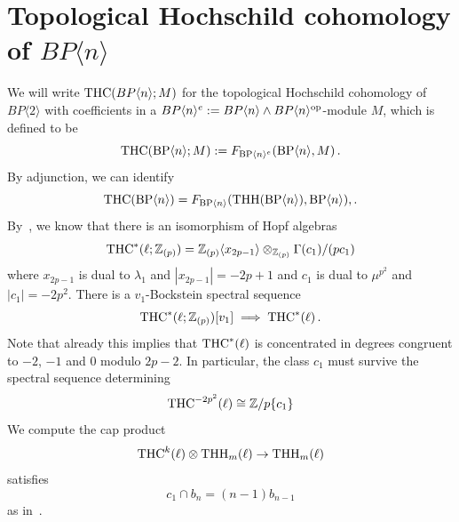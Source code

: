 
\section{Topological Hochschild cohomology of $BP\langle n\rangle$}
We will write $\mathrm{THC}(BP\langle n\rangle ; M)$ for the topological Hochschild cohomology of $BP\langle 2\rangle$ with coefficients in a $BP\langle n \rangle^e:=BP\langle n \rangle\wedge BP\langle n \rangle^{\mathrm{op}}$-module $M$, which is defined to be
\[ 
\mathrm{THC}(\mathrm{BP}\langle n\rangle;M) :=  F_{\mathrm{BP}\langle n\rangle^e} (\mathrm{BP}\langle n\rangle,M) \,. 
\]
By adjunction, we can identify
\[\mathrm{THC}(\mathrm{BP}\langle n\rangle)=F_{\mathrm{BP}\langle n\rangle} (\operatorname{THH}(\mathrm{BP}\langle n\rangle),\mathrm{BP}\langle n\rangle),. 
\]
By~\cite{AHL10}, we know that there is an isomorphism of Hopf algebras
\[ \mathrm{THC}^*(\ell;\mathbb{Z}_{(p)})=\mathbb{Z}_{(p)}\langle x_{2p-1}\rangle\otimes_{\mathbb{Z}_{(p)}}\Gamma(c_{1})/(pc_{1})
\]
where $x_{2p-1}$ is dual to $\lambda_1$ and $|x_{2p-1}|=-2p+1$ and $c_1$ is dual to $\mu^{p^2}$ and $|c_1|=-2p^2$. 
There is a $v_1$-Bockstein spectral sequence 
\[
\mathrm{THC}^*(\ell;\mathbb{Z}_{(p)})[v_1]\implies  \mathrm{THC}^*(\ell) \,.
\]
Note that already this implies that $\mathrm{THC}^*(\ell)$ is concentrated in degrees congruent to $-2$, $-1$ and $0$ modulo $2p-2$. In particular, the class $c_1$ must survive the spectral sequence determining 
\[ 
\mathrm{THC}^{-2p^2}(\ell)\cong \mathbb{Z}/p\{c_1\}
\]
We compute the cap product 
\[\mathrm{THC}^{k}(\ell)\otimes \operatorname{THH}_{m}(\ell)\to \operatorname{THH}_{m}(\ell)
\]
satisfies  
\[ 
c_1\cap b_n=(n-1)b_{n-1}
\]
as in~\cite[Corollary~5.7]{AHL10}. 
